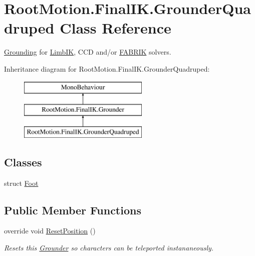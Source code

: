 \hypertarget{class_root_motion_1_1_final_i_k_1_1_grounder_quadruped}{}\section{Root\+Motion.\+Final\+I\+K.\+Grounder\+Quadruped Class Reference}
\label{class_root_motion_1_1_final_i_k_1_1_grounder_quadruped}


\mbox{\hyperlink{class_root_motion_1_1_final_i_k_1_1_grounding}{Grounding}} for \mbox{\hyperlink{class_root_motion_1_1_final_i_k_1_1_limb_i_k}{Limb\+IK}}, C\+CD and/or \mbox{\hyperlink{class_root_motion_1_1_final_i_k_1_1_f_a_b_r_i_k}{F\+A\+B\+R\+IK}} solvers.  


Inheritance diagram for Root\+Motion.\+Final\+I\+K.\+Grounder\+Quadruped\+:\begin{figure}[H]
\begin{center}
\leavevmode
\includegraphics[height=3.000000cm]{class_root_motion_1_1_final_i_k_1_1_grounder_quadruped}
\end{center}
\end{figure}
\subsection*{Classes}
\begin{DoxyCompactItemize}
\item 
struct \mbox{\hyperlink{struct_root_motion_1_1_final_i_k_1_1_grounder_quadruped_1_1_foot}{Foot}}
\end{DoxyCompactItemize}
\subsection*{Public Member Functions}
\begin{DoxyCompactItemize}
\item 
override void \mbox{\hyperlink{class_root_motion_1_1_final_i_k_1_1_grounder_quadruped_a05edde8488de6e2564d75302724dbda7}{Reset\+Position}} ()
\begin{DoxyCompactList}\small\item\em Resets this \mbox{\hyperlink{class_root_motion_1_1_final_i_k_1_1_grounder}{Grounder}} so characters can be teleported instananeously. \end{DoxyCompactList}\end{DoxyCompactItemize}
